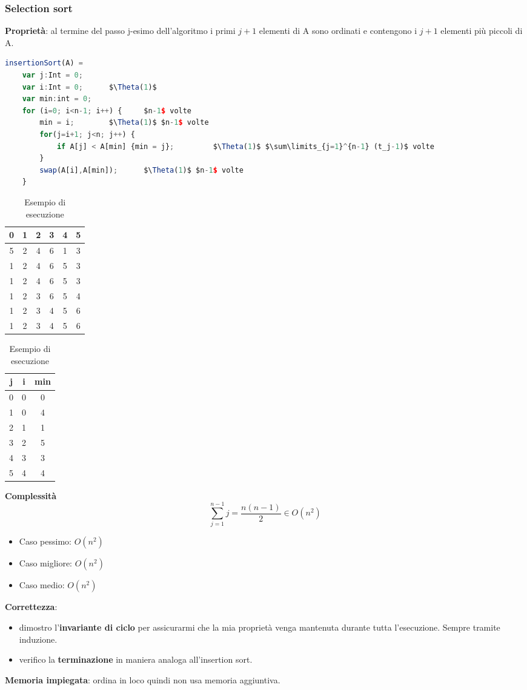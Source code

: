 \subsubsection{Selection sort}
\textbf{Proprietà}: al termine del passo j-esimo dell'algoritmo i primi $j+1$ elementi di A sono ordinati e contengono i $j+1$ elementi più piccoli di A.
\begin{lstlisting}[language=Javascript, caption=Algoritmo selection sort, mathescape=true]
	insertionSort(A) =
	var j:Int = 0;
	var i:Int = 0;		$\Theta(1)$
	var min:int = 0;
	for (i=0; i<n-1; i++) {		$n-1$ volte
		min = i;		$\Theta(1)$ $n-1$ volte
		for(j=i+1; j<n; j++) {
			if A[j] < A[min] {min = j};			$\Theta(1)$ $\sum\limits_{j=1}^{n-1} (t_j-1)$ volte
		}
		swap(A[i],A[min]);		$\Theta(1)$ $n-1$ volte
	}
\end{lstlisting}
\begin{table}[h]
	\begin{tabular}{ |c|c|c|c|c|c| }
		\hline
		0 & 1 & 2 & 3 & 4 & 5 \\
		\hline
		5 & 2 & 4 & 6 & 1 & 3 \\
		\hline 
		1 & 2 & 4 & 6 & 5 & 3 \\
		\hline 
		1 & 2 & 4 & 6 & 5 & 3 \\
		\hline 
		1 & 2 & 3 & 6 & 5 & 4 \\
		\hline 
		1 & 2 & 3 & 4 & 5 & 6 \\
		\hline 
		1 & 2 & 3 & 4 & 5 & 6 \\
		\hline
	\end{tabular}
	\begin{tabular} { |c|c|c|}
		\hline
		j & i & min \\
		\hline
		0 & 0 & 0 \\
		\hline
		1 & 0 & 4 \\
		\hline
		2 & 1 & 1 \\
		\hline
		3 & 2 & 5 \\
		\hline
		4 & 3 & 3 \\
		\hline
		5 & 4 & 4 \\
		\hline
	\end{tabular}
	\caption{Esempio di esecuzione}
\end{table}
\textbf{Complessità}
\begin{equation}
	\sum\limits_{j=1}^{n-1} j = \frac{n(n-1)}{2} \in O(n^2)
\end{equation}
\begin{itemize}
	\item Caso pessimo: $O(n^2)$
	\item Caso migliore: $O(n^2)$
	\item Caso medio: $O(n^2)$
\end{itemize}
\textbf{Correttezza}:
\begin{itemize}
	\item dimostro l'\textbf{invariante di ciclo} per assicurarmi che la mia proprietà venga mantenuta durante tutta l'esecuzione. Sempre tramite induzione.
	\item verifico la \textbf{terminazione} in maniera analoga all'insertion sort.
\end{itemize}
\textbf{Memoria impiegata}: ordina in loco quindi non usa memoria aggiuntiva.